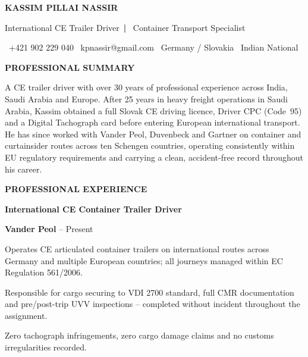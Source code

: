 \documentclass[10pt,a4paper]{article}
\newcommand{\rh}[1]{%
  \vspace{9pt}%
  {\color{navy}\fontsize{7.5}{10}\selectfont\bfseries\MakeUppercase{#1}}\par
  \vspace{2pt}{\color{rulec}\hrule height 0.4pt}\par
  \vspace{6pt}%
}
\newcommand{\job}[3]{%
  \vspace{2pt}%
  {\color{navy}\fontsize{8.5}{11}\selectfont\bfseries #1}\par
  \vspace{1pt}%
  {\color{dblue}\fontsize{7.5}{9.5}\selectfont\bfseries #2}%
  \hfill
  {\color{accent}\fontsize{7}{9}\selectfont #3}\par
  \vspace{4pt}%
}
\begin{document}
\begin{minipage}[t][297mm][t]{0.682\textwidth}

\colorbox{pgray}{%
\begin{minipage}[t]{\textwidth}
\hspace{10pt}\begin{minipage}[t]{\textwidth-20pt}
\vspace{11pt}
{\color{navy}\fontsize{19}{23}\selectfont\bfseries
  KASSIM PILLAI NASSIR}\par
\vspace{3pt}
{\color{dblue}\fontsize{8.5}{11}\selectfont
  International CE Trailer Driver\ \textbf{|}%
  \ Container Transport Specialist}\par
\vspace{5pt}
{\color{accent}\fontsize{7}{9}\selectfont
  \faPhone\ +421 902 229 040
  \quad{\color{rulec}|}\quad
  \faEnvelope\ kpnassir@gmail.com
  \quad{\color{rulec}|}\quad
  \faMapMarkerAlt\ Germany / Slovakia
  \quad{\color{rulec}|}\quad
  \faGlobe\ Indian National}\par
\vspace{9pt}
\end{minipage}
\end{minipage}
}

\hspace{10pt}\begin{minipage}[t]{\textwidth-20pt}
\RaggedRight

\rh{Professional Summary}
{\fontsize{7.9}{12}\selectfont\color{body}
A CE trailer driver with over 30 years of professional experience
across India, Saudi Arabia and Europe. After 25 years in heavy
freight operations in Saudi Arabia, Kassim obtained a full Slovak
CE driving licence, Driver CPC (Code~95) and a Digital Tachograph
card before entering European international transport. He has since
worked with Vander Peol, Duvenbeck and Gartner on container and
curtainsider routes across ten Schengen countries, operating
consistently within EU regulatory requirements and carrying a
clean, accident-free record throughout his career.\par
}

\rh{Professional Experience}

\job{International CE Container Trailer Driver}%
    {Vander Peol}{[Start Date] -- Present}
\begin{cvlist}
\item Operates CE articulated container trailers on international
  routes across Germany and multiple European countries; all
  journeys managed within EC Regulation 561/2006.
\item Responsible for cargo securing to VDI 2700 standard, full
  CMR documentation and pre/post-trip UVV inspections --
  completed without incident throughout the assignment.
\item Zero tachograph infringements, zero cargo damage claims and
  no customs irregularities recorded.
\end{cvlist}


\end{minipage}
\end{minipage}
\end{document}
